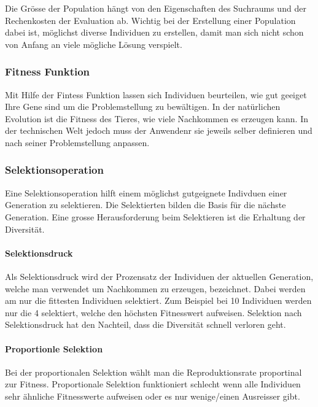       Die Grösse der Population hängt von den Eigenschaften des Suchraums und der Rechenkosten der Evaluation ab.
      Wichtig bei der Erstellung einer Population dabei ist, möglichst diverse Individuen zu erstellen,
      damit man sich nicht schon von Anfang an viele mögliche Lösung verspielt.

    \subsubsection{Fitness Funktion}

      Mit Hilfe der Fintess Funktion lassen sich Individuen beurteilen,
      wie gut geeiget Ihre Gene sind um die Problemstellung zu bewältigen.
      In der natürlichen Evolution ist die Fitness des Tieres, wie viele Nachkommen es erzeugen kann.
      In der technischen Welt jedoch muss der Anwendenr sie jeweils selber definieren und
      nach seiner Problemstellung anpassen.

    \subsubsection{Selektionsoperation}

      Eine Selektionsoperation hilft einem möglichst gutgeignete Indivduen einer Generation zu selektieren.
      Die Selektierten bilden die Basis für die nächste Generation.
      Eine grosse Herausforderung beim Selektieren ist die Erhaltung der Diversität.

      \paragraph{Selektionsdruck}

        Als Selektionsdruck wird der Prozensatz der Individuen der aktuellen Generation,
        welche man verwendet um Nachkommen zu erzeugen, bezeichnet.
        Dabei werden am nur die fittesten Individuen selektiert.
        Zum Beispiel bei 10 Individuen werden nur die 4 selektiert, welche den höchsten Fitnesswert aufweisen.
        Selektion nach Selektionsdruck hat den Nachteil, dass die Diversität schnell verloren geht.

      \paragraph{Proportionle Selektion}

        Bei der proportionalen Selektion wählt man die Reproduktionsrate proportinal zur Fitness.
        Proportionale Selektion funktioniert schlecht wenn alle Individuen sehr ähnliche Fitnesswerte aufweisen oder es nur wenige/einen Ausreisser gibt.

